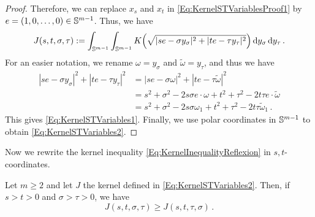 \begin{proof}
Therefore, we can replace $x_s$ and $x_t$ in \eqref{Eq:KernelSTVariablesProof1} by $e =(1,0,\ldots,
0) \in \mathbb{S}^{m-1}$. Thus, we have
\begin{equation}
\label{Eq:KernelSTVariablesProof2}
J(s,t,\sigma, \tau) := \int_{\mathbb{S}^{m-1}}  \int_{\mathbb{S}^{m-1}} K\Big( \sqrt{|s e - \sigma y_\sigma|^2 + |t e - \tau y_\tau|^2 }\Big) \,\mathrm{d} y_\sigma \,\mathrm{d} y_\tau \,.
\end{equation}
For an easier notation, we rename $\omega = y_\sigma$ and $\tilde\omega = y_\tau$, and thus we have
\begin{align*}
|s e - \sigma y_\sigma|^2 + |t e - \tau y_\tau|^2 &= |s e - \sigma \omega|^2 + |t e - \tau \tilde\omega|^2\\
&= s^2 +\sigma^2 - 2 s \sigma e \cdot \omega + t^2 + \tau^2 - 2 t \tau e\cdot \tilde\omega \\
&= s^2 +\sigma^2 - 2 s \sigma \omega_1 + t^2 + \tau^2 - 2t \tau\tilde\omega_1\,.
\end{align*}
This gives \eqref{Eq:KernelSTVariables1}. Finally, we use polar coordinates in $\mathbb{S}^{m-1}$ to
obtain \eqref{Eq:KernelSTVariables2}.
\end{proof}







Now we rewrite the kernel inequality \eqref{Eq:KernelInequalityReflexion} in $s,t$-coordinates.

\begin{lemma}
\label{Lemma:KernelInequalityCone} 
Let $m\geq 2$ and let $J$ the kernel defined in
\eqref{Eq:KernelSTVariables2}. Then, if $s>t>0$ and $\sigma > \tau>0$, we have 
\begin{equation}
\label{Eq:KernelInequalityCone}
J(s,t,\sigma, \tau) \geq J(s,t,\tau, \sigma)\,.
\end{equation}
\end{lemma}

